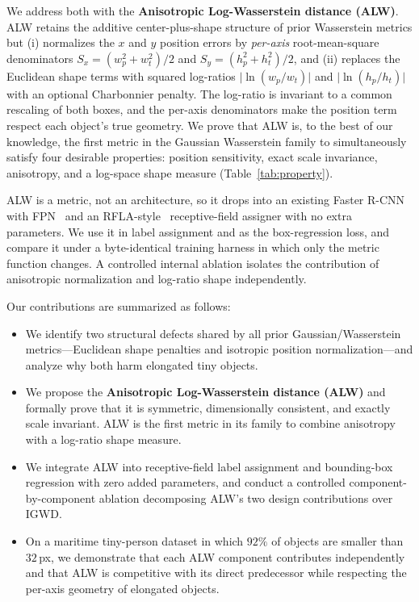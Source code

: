 \documentclass[journal]{IEEEtran}
\newcommand{\Sx}{S_x}
\newcommand{\Sy}{S_y}
\begin{document}
We address both with the \textbf{Anisotropic Log-Wasserstein distance (ALW)}.
ALW retains the additive center-plus-shape structure of prior Wasserstein
metrics but (i) normalizes the $x$ and $y$ position errors by \emph{per-axis}
root-mean-square denominators $\Sx=(w_p^2+w_t^2)/2$ and
$\Sy=(h_p^2+h_t^2)/2$, and (ii) replaces the Euclidean shape terms with squared
log-ratios $\lvert\ln(w_p/w_t)\rvert$ and $\lvert\ln(h_p/h_t)\rvert$ with an
optional Charbonnier penalty. The log-ratio is
invariant to a common rescaling of both boxes, and the per-axis denominators
make the position term respect each object's true geometry. We prove that ALW
is, to the best of our knowledge, the first metric in the Gaussian Wasserstein family to simultaneously satisfy four
desirable properties: position sensitivity, exact scale invariance,
anisotropy, and a log-space shape measure (Table~\ref{tab:property}).

ALW is a metric, not an architecture, so it drops into an existing
Faster R-CNN~\cite{ren2015faster} with FPN~\cite{lin2017fpn} and an
RFLA-style~\cite{xu2022rfla} receptive-field assigner with no extra
parameters. We use it in label assignment and as the box-regression loss, and
compare it under a byte-identical training harness in which only the metric
function changes. A controlled internal ablation isolates the contribution of
anisotropic normalization and log-ratio shape independently.

Our contributions are summarized as follows:
\begin{itemize}
  \item We identify two structural defects shared by all prior
  Gaussian/Wasserstein metrics---Euclidean shape penalties and isotropic
  position normalization---and analyze why both harm elongated tiny objects.
  \item We propose the \textbf{Anisotropic Log-Wasserstein distance (ALW)} and
  formally prove that it is symmetric, dimensionally consistent, and exactly
  scale invariant. ALW is the first metric in its family to combine anisotropy
  with a log-ratio shape measure.
  \item We integrate ALW into receptive-field label assignment and
  bounding-box regression with zero added parameters, and conduct a controlled
  component-by-component ablation decomposing ALW's two design contributions
  over IGWD.
  \item On a maritime tiny-person dataset in which $92\%$ of objects are
  smaller than $32$\,px, we demonstrate that each ALW component contributes
  independently and that ALW is competitive with its direct predecessor while
  respecting the per-axis geometry of elongated objects.
\end{itemize}
\end{document}
